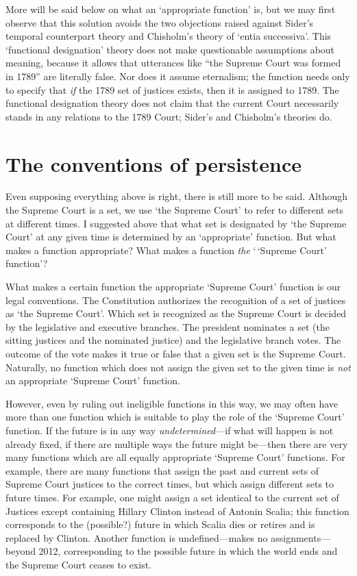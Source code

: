 \documentclass[11pt]{article}
\begin{document}
\begin{spacing}{1.5}
More will be said below on what an `appropriate function' is, but we
may first observe that this solution avoids the two objections raised
against Sider's temporal counterpart theory and Chisholm's theory of
`entia successiva'.  This `functional designation' theory does not
make questionable assumptions about meaning, because it allows that
utterances like ``the Supreme Court was formed in 1789'' are literally
false.  Nor does it assume eternalism; the function needs only to
specify that {\em if} the 1789 set of justices exists, then it is
assigned to 1789.  The functional designation theory does not claim
that the current Court necessarily stands in any relations to the 1789
Court; Sider's and Chisholm's theories do.

\section{The conventions of persistence}
\label{set-convention}
Even supposing everything above is right, there is still more to be
said.  Although the Supreme Court is a set, we use `the Supreme Court'
to refer to different sets at different times.  I suggested above that
what set is designated by `the Supreme Court' at any given time is
determined by an `appropriate' function.  But what makes a function
appropriate?  What makes a function {\em the} `\,`Supreme Court'
function'?

What makes a certain function the appropriate `Supreme Court' function
is our legal conventions.  The Constitution authorizes the recognition
of a set of justices as `the Supreme Court'.  Which set is recognized
as the Supreme Court is decided by the legislative and executive
branches.  The president nominates a set (the sitting justices and the
nominated justice) and the legislative branch votes.  The outcome of
the vote makes it true or false that a given set is the Supreme
Court.  Naturally, no function which does not assign the given set to
the given time is {\em not} an appropriate `Supreme Court' function.

However, even by ruling out ineligible functions in this way, we may
often have more than one function which is suitable to play the role
of the `Supreme Court' function.  If the future is in any way {\em
  undetermined}---if what will happen is not already fixed, if there
are multiple ways the future might be---then there are very many
functions which are all equally appropriate `Supreme Court' functions.
For example, there are many functions that assign the past and current
sets of Supreme Court justices to the correct times, but which assign
different sets to future times.  For example, one might assign a set
identical to the current set of Justices except containing Hillary
Clinton instead of Antonin Scalia; this function corresponds to the
(possible?) future in which Scalia dies or retires and is replaced by
Clinton.  Another function is undefined---makes no
assignments---beyond 2012, corresponding to the possible future in
which the world ends and the Supreme Court ceases to exist.


\end{spacing}
\end{document}
